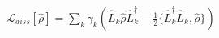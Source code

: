 \documentclass[preview]{standalone}
\begin{document}
\begin{align*}
\mathcal{L}_{diss}[\hat{\rho}] = \sum_k \gamma_k \left(\hat{L}_k\hat{\rho}\hat{L}_k^\dagger - \frac{1}{2}\{\hat{L}_k^\dagger\hat{L}_k, \hat{\rho}\}\right)
\end{align*}
\end{document}
